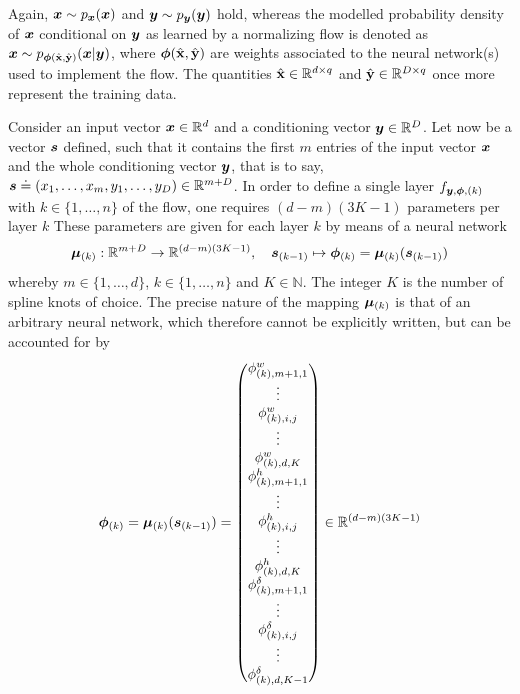 \documentclass[a4paper,12pt]{report}
\begin{document}
Again, $\bm{x} \sim p_{\bm{x}}(\bm{x})$ and $\bm{y} \sim p_{\bm{y}}(\bm{y})$ hold, whereas the modelled probability density of $\bm{x}$ conditional on $\bm{y}$ as learned by a normalizing flow is denoted as $\bm{x} \sim p_{\bm{\phi}(\hat{\boldsymbol{\mathbf{x}}},\hat{\boldsymbol{\mathbf{y}}})}(\bm{x}|\bm{y})$, where $\bm{\phi}(\hat{\boldsymbol{\mathbf{x}}},\hat{\boldsymbol{\mathbf{y}}})$ are weights associated to the neural network(s) used to implement the flow. The quantities $\hat{\boldsymbol{\mathbf{x}}} \in \mathbb{R}^{d\times q}$ and $\hat{\boldsymbol{\mathbf{y}}} \in \mathbb{R}^{D \times q}$ once more represent the training data.

Consider an input vector $\bm{x} \in \mathbb{R}^d$ and a conditioning vector $\bm{y} \in \mathbb{R}^D$. Let now be a vector $\bm{s}$ defined, such that it contains the first $m$ entries of the input vector $\bm{x}$ and the whole conditioning vector $\bm{y}$, that is to say, $\bm{s} \doteq (x_1,\dots,x_m,y_1,\dots,y_D) \in \mathbb{R}^{m+D}$. In order to define a single layer $f_{\bm{y},\bm{\phi},(k)}$ with $k \in \{1,\dots,n\}$ of the flow, one requires $(d-m)(3K-1)$ parameters per layer $k$ These parameters are given for each layer $k$ by means of a neural network \begin{equation}
\bm{\mu}_{(k)}: \mathbb{R}^{m+D}\rightarrow \mathbb{R}^{(d-m)(3K-1)}, \quad \bm{s}_{(k-1)} \mapsto \bm{\phi}_{(k)} = \bm{\mu}_{(k)}(\bm{s}_{(k-1)})
\end{equation} whereby $m \in \{1,\dots,d\}$, $k \in \{1,\dots,n\}$ and $K \in \mathbb{N}$. The integer $K$ is the number of spline knots of choice. The precise nature of the mapping $\bm{\mu}_{(k)}$ is that of an arbitrary neural network, which therefore cannot be explicitly written, but can be accounted for by
\begin{align}
\begin{aligned}
\bm{\phi}_{(k)} = \bm{\mu}_{(k)}(\bm{s}_{(k-1)}) = \begin{pmatrix}
\phi_{(k),m+1,1}^w \\
\vdots \\
\phi_{(k),i,j}^w \\
\vdots \\
\phi_{(k),d,K}^w \\
\phi_{(k),m+1,1}^h \\
\vdots \\
\phi_{(k),i,j}^h \\
\vdots \\
\phi_{(k),d,K}^h \\
\phi_{(k),m+1,1}^\delta \\
\vdots \\
\phi_{(k),i,j}^\delta \\
\vdots \\
\phi_{(k),d,K-1}^\delta \\
\end{pmatrix} \in \mathbb{R}^{(d-m)(3K-1)}
\end{aligned}
\end{align}
\end{document}
